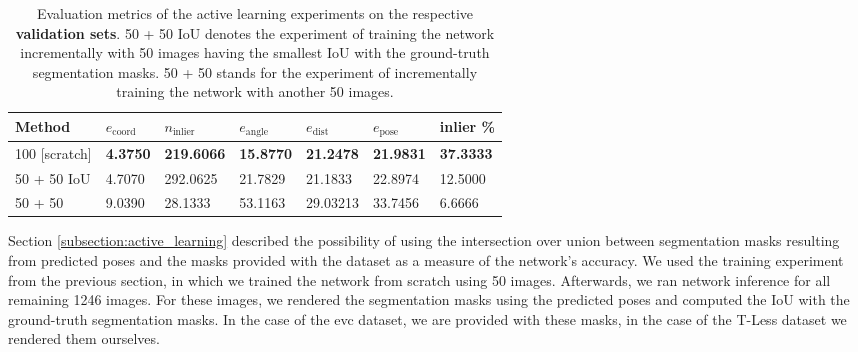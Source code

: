 \begin{table}[b]
\centering
\begin{tabular}{|l||llllll|} \hline
Method            & $e_{\text{coord}}$ & $n_{\text{inlier}}$ & $e_{\text{angle}}$ & $e_{\text{dist}}$ & $e_{\text{pose}}$  & inlier \% \\ \hline \hline \rowcolor{Gray}
100 {[}scratch{]} & \textbf{4.3750}             & \textbf{219.6066}                 & \textbf{15.8770}             & \textbf{21.2478}            & \textbf{21.9831}      & \textbf{37.3333} \\ \hline
50 + 50 IoU       & 4.7070             & 292.0625                & 21.7829             & 21.1833           & 22.8974  & 12.5000 \\ \hline \rowcolor{Gray}
50 + 50           & 9.0390             & 28.1333                   & 53.1163           & 29.03213           & 33.7456  &6.6666   \\ \hline      
\end{tabular}
\caption{Evaluation metrics of the active learning experiments on the respective \textbf{validation sets}. 50 + 50 IoU denotes the experiment of training the network incrementally with 50 images having the smallest IoU with the ground-truth segmentation masks. 50 + 50 stands for the experiment of incrementally training the network with another 50 images.}
\label{table:active_learning_val}
\end{table}

Section \ref{subsection:active_learning} described the possibility of using the intersection over union between segmentation masks resulting from predicted poses and the masks provided with the dataset as a measure of the network's accuracy. We used the training experiment from the previous section, in which we trained the network from scratch using 50 images. Afterwards, we ran network inference for all remaining 1246 images. For these images, we rendered the segmentation masks using the predicted poses and computed the IoU with the ground-truth segmentation masks. In the case of the \ac{evc} dataset, we are provided with these masks, in the case of the T-Less dataset we rendered them ourselves. 

